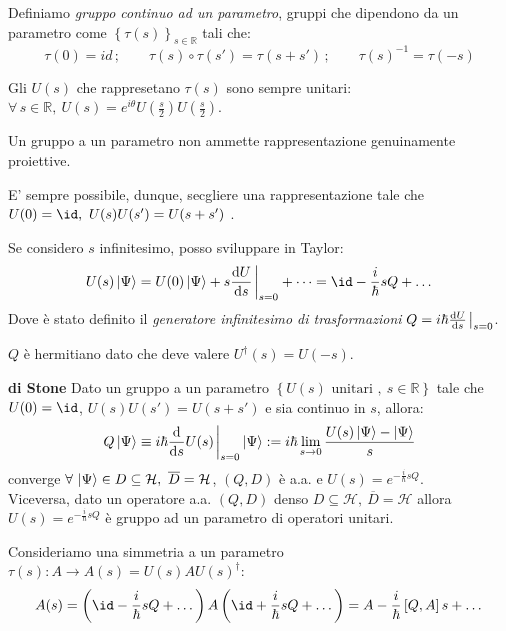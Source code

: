 \begin{definition}
    Definiamo \textit{gruppo continuo ad un parametro}, gruppi che dipendono da un parametro come \(\left\{ \tau(s) \right\}_{s \in \mathbb{R}}\) tali che:
    \[
        \tau(0)= id\,;\qquad \tau(s)\circ \tau(s') = \tau(s+s')\,;\qquad\tau(s)^{-1} = \tau(-s )
    \]
\end{definition}

Gli \(U(s)\) che rappresetano \(\tau(s )\) sono sempre unitari: \(\forall \, s \in \mathbb{R}, \ U(s) = e^{i\theta}U(\frac{s}{2})U(\frac{s}{2})\).


\begin{theorem}
    Un gruppo a un parametro non ammette rappresentazione genuinamente proiettive.
\end{theorem}
E' sempre possibile, dunque, secgliere una rappresentazione tale che \(U(0)= \id, \  U(s)U(s')= U(s+s')\) .

Se considero \(s \) infinitesimo, posso sviluppare in Taylor:
\begin{equation}
    U(s )\ket{\Psi}= U(0)\ket{\Psi}+ s \dv{U}{s} \eval_{s = 0} + \dots = \id - \frac{i}{\hbar}s Q    + \dots
\end{equation}
Dove è stato definito il \textit{generatore infinitesimo di trasformazioni} \(Q = i\hbar \dv{U}{s}\eval_{s =0}\).
\begin{remark}
    \(Q\) è hermitiano dato che deve valere \(U^\dagger(s)= U(-s)\).
\end{remark}


\begin{theorem}\label{theo: Stone}
    {\normalfont\textbf{di Stone}} Dato un gruppo a un parametro \(\left\{ U(s) \text{ unitari } , \ s \in \mathbb{R}\right\}\) tale che \(U(0)= \id\), \(U(s )U (s') = U(s+s')\) e sia continuo in \(s \), allora:
    \[
        Q\ket{\Psi} \equiv i\hbar \dv{s}U(s )\eval_{s=0}\ket{\Psi}    := i\hbar\lim_{s \to 0} \frac{U(s)\ket{\Psi}-\ket{\Psi}}{s}
    \]
    converge \(\forall\,\ket{\Psi}\in  D \subseteq \mathcal{H}, \ \overline{D}= \mathcal{H}\), \((Q,D)\) è a.a. e \(U(s )= e^{-\frac{i}{\hbar}sQ}\).\\
    Viceversa, dato un operatore a.a. \((Q, D)\) denso \(D \subseteq\mathcal{H}, \ \overline{D}= \mathcal{H}\) allora \(U(s)= e^{-\frac{i}{\hbar}sQ}\) è gruppo ad un parametro di operatori unitari.
\end{theorem}

Consideriamo una simmetria a un parametro \(\tau(s ): A \to A(s )= U(s )A U(s )^\dagger \):
\[
    A(s) = 
    \left( \id - \frac{i}{\hbar}sQ + \dots \right)
    A
    \left( \id + \frac{i}{\hbar}sQ + \dots \right)
    = A - \frac{i}{\hbar}\left[ Q, A \right]s + \dots
\]

